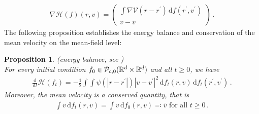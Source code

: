 \documentclass[11pt]{article}
\newtheorem{proposition}[theorem]{Proposition}
\newcommand{\R}[0]{\mathbb R}
\newcommand{\dx}[1]{\frac{\mathrm{d}}{\mathrm{d}#1}}
\newcommand{\abs}[1]{\left| #1 \right|}
\newcommand{\Ppo}[1]{
    \ifx #1\infty
        \mathcal{P}_{c,0}
    \else 
        \mathcal{P}_{#1,0}
    \fi 
}
\newcommand{\msolinit}[1]{f_0(#1)}
\newcommand{\msolt}[2]{f_{#1}(#2)}
\begin{document}
\begin{bibunit}[unsrtnat]
    \begin{align*}
        \nabla \mathcal{H}(f)(r,v) = \begin{pmatrix}
            \int \nabla \mathcal{V}(r-r^\prime) \, \mathrm{d} f(r^\prime, v^\prime) \\ 
            v - \bar{v}
        \end{pmatrix} \, .
    \end{align*}
    The following proposition establishes the energy balance and conservation of the mean velocity on the mean-field level: 
    \begin{proposition}(energy balance, see \cite[Theorem $4.1$]{JaTo2024})\label{prop:Hbalance} \\
        For every initial condition $f_0 \in \Ppo{\infty}(\R^d \times \R^d)$ and all $t \geq 0$, we have 
        \begin{align}
            \dx{t} \mathcal{H}(f_t) = -\frac{1}{2} \int \int \psi (\abs{r-r^\prime}) \abs{v-v^\prime}^2 \, \mathrm{d}\msolt{t}{r,v} \, \mathrm{d} \msolt{t}{r^\prime, v^\prime}  \label{eq:enbalance} \, .
        \end{align}
        Moreover, the mean velocity is a conserved quantity, that is 
        \begin{align*}
            \int v \, \mathrm{d} \msolt{t}{r,v} = \int v \, \mathrm{d} \msolinit{r,v} \eqcolon \overline{v} \text{ for all } t \geq 0 \, .
        \end{align*}
    \end{proposition}

\newpage


\end{bibunit}
\end{document}
